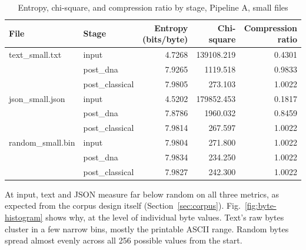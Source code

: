 \documentclass[12pt,a4paper,twoside]{report}
\numberwithin{equation}{chapter}
\begin{document}
\begin{table}[h]
\centering
\caption{Entropy, chi-square, and compression ratio by stage, Pipeline A, small files}
\label{tab:results-small}
\begin{tabular}{llrrr}
\toprule
File & Stage & Entropy (bits/byte) & Chi-square & Compression ratio \\
\midrule
text\_small.txt & input & 4.7268 & 139108.219 & 0.4301 \\
 & post\_dna & 7.9265 & 1119.518 & 0.9833 \\
 & post\_classical & 7.9805 & 273.103 & 1.0022 \\
json\_small.json & input & 4.5202 & 179852.453 & 0.1817 \\
 & post\_dna & 7.8786 & 1960.032 & 0.8459 \\
 & post\_classical & 7.9814 & 267.597 & 1.0022 \\
random\_small.bin & input & 7.9804 & 271.800 & 1.0022 \\
 & post\_dna & 7.9834 & 234.250 & 1.0022 \\
 & post\_classical & 7.9827 & 242.300 & 1.0022 \\
\bottomrule
\end{tabular}
\end{table}

At input, text and JSON measure far below random on all three metrics,
as expected from the corpus design itself (Section~\ref{sec:corpus}).
Fig.~\ref{fig:byte-histogram} shows why, at the level of individual
byte values. Text's raw bytes
cluster in a few narrow bins, mostly the printable ASCII range. Random
bytes spread almost evenly across all 256 possible values from the
start.
\end{document}
